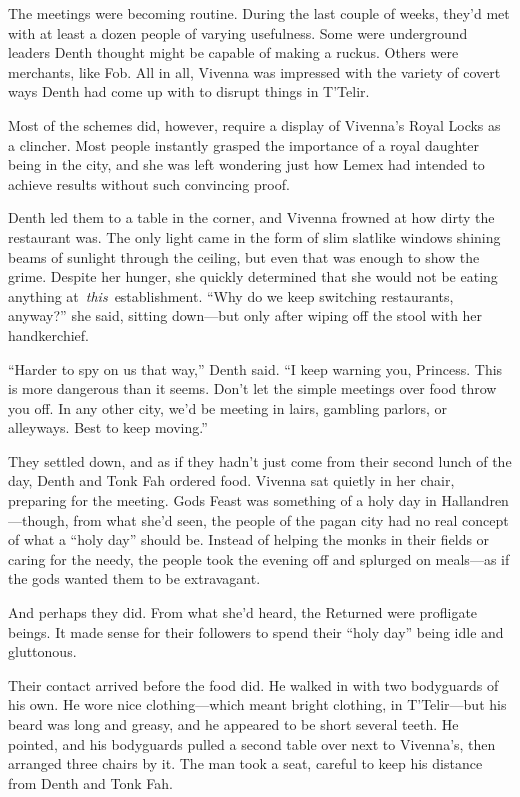 The meetings were becoming routine. During the last couple of weeks, they’d met with at least a dozen people of varying usefulness. Some were underground leaders Denth thought might be capable of making a ruckus. Others were merchants, like Fob. All in all, Vivenna was impressed with the variety of covert ways Denth had come up with to disrupt things in T’Telir.

Most of the schemes did, however, require a display of Vivenna’s Royal Locks as a clincher. Most people instantly grasped the importance of a royal daughter being in the city, and she was left wondering just how Lemex had intended to achieve results without such convincing proof.

Denth led them to a table in the corner, and Vivenna frowned at how dirty the restaurant was. The only light came in the form of slim slatlike windows shining beams of sunlight through the ceiling, but even that was enough to show the grime. Despite her hunger, she quickly determined that she would not be eating anything at~\textit{this}~establishment. “Why do we keep switching restaurants, anyway?” she said, sitting down—but only after wiping off the stool with her handkerchief.

“Harder to spy on us that way,” Denth said. “I keep warning you, Princess. This is more dangerous than it seems. Don’t let the simple meetings over food throw you off. In any other city, we’d be meeting in lairs, gambling parlors, or alleyways. Best to keep moving.”

They settled down, and as if they hadn’t just come from their second lunch of the day, Denth and Tonk Fah ordered food. Vivenna sat quietly in her chair, preparing for the meeting. Gods Feast was something of a holy day in Hallandren—though, from what she’d seen, the people of the pagan city had no real concept of what a “holy day” should be. Instead of helping the monks in their fields or caring for the needy, the people took the evening off and splurged on meals—as if the gods wanted them to be extravagant.

And perhaps they did. From what she’d heard, the Returned were profligate beings. It made sense for their followers to spend their “holy day” being idle and gluttonous.

Their contact arrived before the food did. He walked in with two bodyguards of his own. He wore nice clothing—which meant bright clothing, in T’Telir—but his beard was long and greasy, and he appeared to be short several teeth. He pointed, and his bodyguards pulled a second table over next to Vivenna’s, then arranged three chairs by it. The man took a seat, careful to keep his distance from Denth and Tonk Fah.

